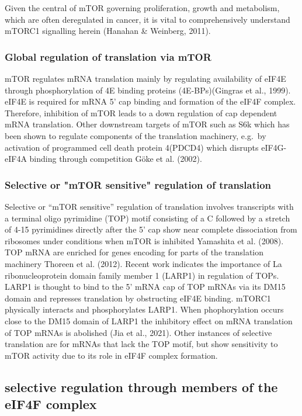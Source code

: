 \documentclass[
  12pt,
  openany]{book}
\begin{document}
Given the central of mTOR governing proliferation, growth and metabolism, which are often deregulated in cancer, it is vital to comprehensively understand mTORC1 signalling herein (Hanahan \& Weinberg, 2011).

\subsubsection{Global regulation of translation via mTOR}

mTOR regulates mRNA translation mainly by regulating availability of eIF4E through phosphorylation of 4E binding proteins (4E-BPs)(Gingras et al., 1999). eIF4E is required for mRNA 5' cap binding and formation of the eIF4F complex. Therefore, inhibition of mTOR leads to a down regulation of cap dependent mRNA translation.
Other downstream targets of mTOR such as S6k which has been shown to regulate components of the translation machinery, e.g.~by activation of programmed cell death protein 4(PDCD4) which disrupts eIF4G-eIF4A binding through competition Göke et al. (2002).

\subsubsection{Selective or "mTOR sensitive" regulation of translation}

Selective or ``mTOR sensitive'' regulation of translation involves transcripts with a terminal oligo pyrimidine (TOP) motif consisting of a C followed by a stretch of 4-15 pyrimidines directly after the 5' cap show near complete dissociation from ribosomes under conditions when mTOR is inhibited Yamashita et al. (2008). TOP mRNA are enriched for genes encoding for parts of the translation machinery Thoreen et al. (2012). Recent work indicates the importance of La ribonucleoprotein domain family member 1 (LARP1) in regulation of TOPs. LARP1 is thought to bind to the 5' mRNA cap of TOP mRNAs via its DM15 domain and represses translation by obstructing eIF4E binding. mTORC1 physically interacts and phosphorylates LARP1. When phophorylation occurs close to the DM15 domain of LARP1 the inhibitory effect on mRNA translation of TOP mRNAs is abolished (Jia et al., 2021). Other instances of selective translation are for mRNAs that lack the TOP motif, but show sensitivity to mTOR activity due to its role in eIF4F complex formation.

\subsection{selective regulation through members of the eIF4F complex}
\end{document}
